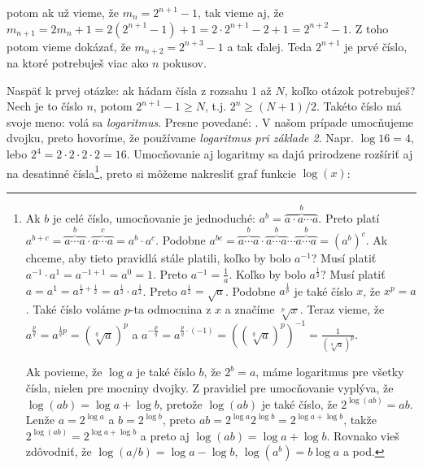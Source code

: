 potom ak už vieme, že $m_n=2^{n+1}-1$, tak vieme aj, že $m_{n+1}=2m_n+1=2(2^{n+1}-1)+1=
2\cdot2^{n+1}-2+1=2^{n+2}-1$. Z toho potom vieme dokázať, že $m_{n+2}=2^{n+3}-1$ a tak ďalej.
Teda $2^{n+1}$ je prvé číslo, na ktoré potrebuješ viac ako $n$ pokusov. 


Naspäť k prvej otázke: ak hádam čísla z rozsahu 1 až $N$, koľko otázok potrebuješ? Nech
je to číslo $n$, potom $2^{n+1}-1\ge N$, t.j. $2^n\ge(N+1)/2$. Takéto číslo má svoje meno:
volá sa {\em logaritmus}. Presne povedané: . V našom prípade umocňujeme dvojku, preto hovoríme, že používame 
{\em logaritmus pri základe 2}. Napr. $\log16=4$, lebo $2^4=2\cdot2\cdot2\cdot2=16$. 
Umocňovanie aj logaritmy sa dajú prirodzene rozšíriť aj na desatinné čísla\label{page:umocnovanie}\footnote{%
  Ak $b$ je celé číslo, umocňovanie je jednoduché: 
  $a^b=\overbrace{a\cdot a\cdots a}^b$. Preto platí 
  $a^{b+c}=\overbrace{a\cdots a}^b\cdot\overbrace{a\cdots a}^c=a^b\cdot a^c$.
  Podobne $a^{bc}=
  \overbrace{a\cdots a}^b\cdot
  \overbrace{a\cdots a}^b
  \cdots\overbrace{a\cdots a}^b=(a^b)^c$. Ak chceme,
  aby tieto pravidlá stále platili, koľko by bolo $a^{-1}$? Musí platiť
  $a^{-1}\cdot a^1=a^{-1+1}=a^0=1$. Preto $a^{-1}=\frac{1}{a}$.
  Koľko by bolo $a^\frac{1}{2}$? Musí platiť
  $a=a^1=a^{\frac{1}{2}+\frac{1}{2}}=a^\frac{1}{2}\cdot a^\frac{1}{2}$. Preto 
  $a^\frac{1}{2}=\sqrt{a}$. Podobne $a^\frac{1}{p}$ je také číslo $x$, že $x^p=a$.
  Také číslo voláme $p$-ta odmocnina z $x$ a značíme $\sqrt[p]{x}$.
  Teraz vieme, že $a^\frac{p}{q}=a^{\frac{1}{q}p}=(\sqrt[q]{a})^p$ a 
  $a^{-\frac{p}{q}}=a^{\frac{p}{q}\cdot(-1)}=((\sqrt[q]{a})^p)^{-1}=\frac{1}{(\sqrt[q]{a})^p}$.

  Ak povieme, že $\log a$ je také číslo $b$, že $2^b=a$, máme logaritmus pre všetky čísla,
  nielen pre mocniny dvojky. Z pravidiel pre umocňovanie vyplýva, že 
  $\log(ab)=\log a+\log b$, pretože $\log(ab)$ je také číslo, že $2^{\log(ab)}=ab$.
  Lenže $a=2^{\log a}$ a $b=2^{\log b}$, preto $ab=2^{\log a}2^{\log b}=2^{\log a+\log b}$,
  takže $2^{\log(ab)}=2^{\log a+\log b}$ a preto aj $\log(ab)=\log a+\log b$.
  Rovnako vieš zdôvodniť, že $\log(a/b)=\log a-\log b$, $\log(a^b)=b\log a$ a pod.
}, preto si môžeme nakresliť graf funkcie $\log(x)$:



